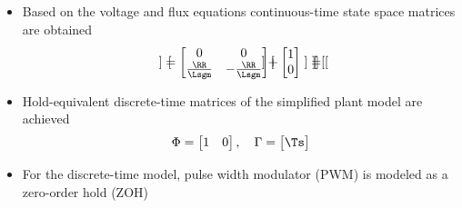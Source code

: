 \documentclass[11pt,aspectratio=169]{beamer}
\begin{document}
\begin{frame}
\begin{itemize}
	\item Based on the voltage and flux equations continuous-time state space matrices are obtained
	\begin{align*}
&\begin{bmatrix}
\end{bmatrix}
=\begin{bmatrix}
0 & 0\\
\frac{\RR}{\Lsgm} & -\frac{\RR}{\Lsgm}
\end{bmatrix}
\begin{bmatrix}
\end{bmatrix}
+\begin{bmatrix}
1\\
0
\end{bmatrix}
&\begin{bmatrix}
\end{bmatrix}
=
\begin{bmatrix}
\end{bmatrix}
\begin{bmatrix}
\end{bmatrix}
\end{align*}

\end{itemize}
  \begin{itemize}
\item Hold-equivalent discrete-time matrices of the simplified plant model are achieved 
\begin{align*} 
\Phi=
\begin{bmatrix}
1 & 0\\
\end{bmatrix} ,  \quad 
\Gamma=
\begin{bmatrix}
\Ts\\
\end{bmatrix}
\end{align*}
\item For the discrete-time model, pulse width modulator (PWM) is modeled as a zero-order hold (ZOH)
\end{itemize}
\end{frame}
\end{document}
